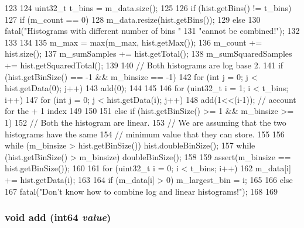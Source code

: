 \begin{DoxyCode}
123 {
124     uint32_t t_bins = m_data.size();
125 
126     if (hist.getBins() != t_bins) {
127         if (m_count == 0) {
128             m_data.resize(hist.getBins());
129         } else {
130             fatal("Histograms with different number of bins "
131                   "cannot be combined!");
132         }
133     }
134 
135     m_max = max(m_max, hist.getMax());
136     m_count += hist.size();
137     m_sumSamples += hist.getTotal();
138     m_sumSquaredSamples += hist.getSquaredTotal();
139 
140     // Both histograms are log base 2.
141     if (hist.getBinSize() == -1 && m_binsize == -1) {
142         for (int j = 0; j < hist.getData(0); j++) {
143             add(0);
144         }
145 
146         for (uint32_t i = 1; i < t_bins; i++) {
147             for (int j = 0; j < hist.getData(i); j++) {
148                 add(1<<(i-1));  // account for the + 1 index
149             }
150         }
151     } else if (hist.getBinSize() >= 1 && m_binsize >= 1) {
152         // Both the histogram are linear.
153         // We are assuming that the two histograms have the same
154         // minimum value that they can store.
155 
156         while (m_binsize > hist.getBinSize()) hist.doubleBinSize();
157         while (hist.getBinSize() > m_binsize) doubleBinSize();
158 
159         assert(m_binsize == hist.getBinSize());
160 
161         for (uint32_t i = 0; i < t_bins; i++) {
162             m_data[i] += hist.getData(i);
163 
164             if (m_data[i] > 0) m_largest_bin = i;
165         }
166     } else {
167         fatal("Don't know how to combine log and linear histograms!");
168     }
169 }
\end{DoxyCode}
\hypertarget{classHistogram_a34a320889bb2239a3345be43348c95d1}{
\subsubsection[{add}]{\setlength{\rightskip}{0pt plus 5cm}void add ({\bf int64} {\em value})}}
\label{classHistogram_a34a320889bb2239a3345be43348c95d1}




